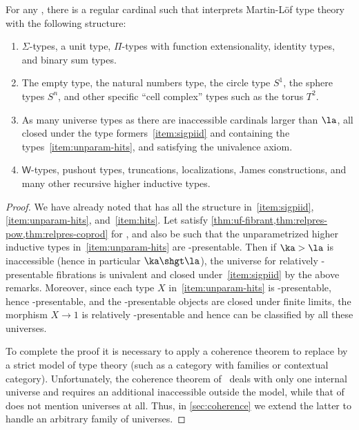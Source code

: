 \begin{thm}\label{thm:ttmt-models}
  For any \ttmt \E, there is a regular cardinal \la such that \E interprets Martin-L\"{o}f type theory with the following structure:
  \begin{enumerate}
  \item $\Sigma$-types, a unit type, $\Pi$-types with function extensionality, identity types, and binary sum types.\label{item:sigpiid}
  \item The empty type, the natural numbers type, the circle type $S^1$, the sphere types $S^n$, and other specific ``cell complex'' types such as the torus $T^2$.\label{item:unparam-hits}
  \item As many universe types as there are inaccessible cardinals larger than $\la$, all closed under the type formers~\ref{item:sigpiid} and containing the types~\ref{item:unparam-hits}, and satisfying the univalence axiom.\label{item:univ}
  \item $\mathsf{W}$-types, pushout types, truncations, localizations, James constructions, and many other recursive higher inductive types.\label{item:hits}
  \end{enumerate}
\end{thm}
\begin{proof}
  We have already noted that \E has all the structure in~\ref{item:sigpiid}, \ref{item:unparam-hits}, and~\ref{item:hits}.
  Let \la satisfy \cref{thm:uf-fibrant,thm:relpres-pow,thm:relpres-coprod} for \E, and also be such that the unparametrized higher inductive types in~\ref{item:unparam-hits} are \la-presentable.
  Then if $\ka>\la$ is inaccessible (hence in particular $\ka\shgt\la$), the universe for relatively \ka-presentable fibrations is univalent and closed under~\ref{item:sigpiid} by the above remarks.
  Moreover, since each type $X$ in~\ref{item:unparam-hits} is \la-presentable, hence \ka-presentable, and the \ka-presentable objects are closed under finite limits, the morphism $X\to 1$ is relatively \ka-presentable and hence can be classified by all these universes.

  To complete the proof it is necessary to apply a coherence theorem to replace \E by a strict model of type theory (such as a category with families or contextual category).
  Unfortunately, the coherence theorem of~\cite{klv:ssetmodel} deals with only one internal universe and requires an additional inaccessible outside the model, while that of~\cite{lw:localuniv} does not mention universes at all.
  Thus, in \cref{sec:coherence} we extend the latter to handle an arbitrary family of universes.
\end{proof}

